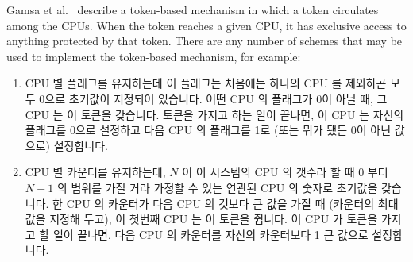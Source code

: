 Gamsa et al.~\cite[Section 5.3]{Gamsa99} describe a token-based
mechanism in which a token circulates among the CPUs.
When the token reaches a given CPU, it has exclusive
access to anything protected by that token.
There are any number of schemes that may be used to implement
the token-based mechanism, for example:

\fi

\begin{enumerate}
\item	CPU 별 플래그를 유지하는데 이 플래그는 처음에는 하나의 CPU 를 제외하곤
	모두 0으로 초기값이 지정되어 있습니다.
	어떤 CPU 의 플래그가 0이 아닐 때, 그 CPU 는 이 토큰을 갖습니다.
	토큰을 가지고 하는 일이 끝나면, 이 CPU 는 자신의 플래그를 0으로
	설정하고 다음 CPU 의 플래그를 1로 (또는 뭐가 됐든 0이 아닌 값으로)
	설정합니다.
\item	CPU 별 카운터를 유지하는데, $N$ 이 이 시스템의 CPU 의 갯수라 할 때 $0$
	부터 $N-1$ 의 범위를 가질 거라 가정할 수 있는 연관된 CPU 의 숫자로
	초기값을 갖습니다.
	한 CPU 의 카운터가 다음 CPU 의 것보다 큰 값을 가질 때 (카운터의 최대
	값을 지정해 두고), 이 첫번째 CPU 는 이 토큰을 쥡니다.
	이 CPU 가 토큰을 가지고 할 일이 끝나면, 다음 CPU 의 카운터를 자신의
	카운터보다 1 큰 값으로 설정합니다.

\end{enumerate}

